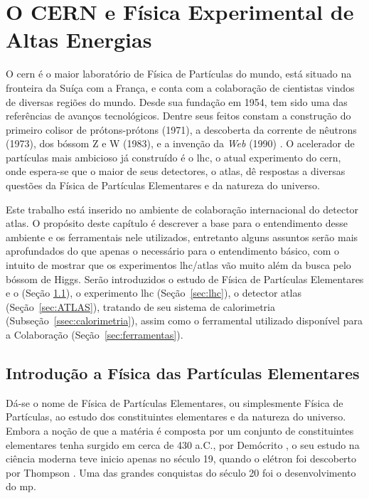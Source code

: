 \chapter{O CERN e Física Experimental de Altas Energias}
\label{cap:cern}
\glsresetall


O \gls{cern} é o maior laboratório de Física de Partículas do mundo, 
está situado na fronteira da Suíça com
a França, e conta com a colaboração de cientistas vindos 
de diversas regiões do mundo. Desde sua fundação em 1954, tem sido uma das referências de
avanços tecnológicos. Dentre seus feitos constam a construção do primeiro 
colisor de prótons-prótons (1971), a descoberta 
da corrente de nêutrons (1973), dos bóssom Z e W (1983), 
e a invenção da \emph{Web} (1990) \cite{webCERN}. O acelerador de partículas mais ambicioso 
\cite{Intro_Standard,Beiser} já construído é o \gls{lhc}, o atual experimento do
\gls{cern}, onde espera-se que o maior de seus 
detectores, o \gls{atlas}, dê respostas a diversas questões da Física de Partículas
Elementares e da natureza do universo.

Este trabalho está inserido no ambiente de colaboração internacional do detector
\gls{atlas}. O propósito deste capítulo é descrever a base para o entendimento desse ambiente
e os ferramentais nele utilizados, entretanto alguns assuntos serão mais
aprofundados do que apenas o necessário para o entendimento básico, com o
intuito de mostrar que os experimentos \gls{lhc}/\gls{atlas} vão muito além 
da busca pelo bóssom de Higgs. Serão introduzidos o estudo de Física de Partículas
Elementares e o  (Seção \ref{sec:fis_part}), 
o experimento \gls{lhc} (Seção~\ref{sec:lhc}), o detector
\gls{atlas} (Seção~\ref{sec:ATLAS}), tratando de seu sistema de calorimetria
(Subseção~\ref{ssec:calorimetria}), assim como o ferramental utilizado
disponível para a Colaboração (Seção~\ref{sec:ferramentas}). 

\section{Introdução a Física das Partículas Elementares}
\label{sec:fis_part}

Dá-se o nome de Física de Partículas Elementares, ou simplesmente Física de
Partículas, ao estudo dos constituintes
elementares e da natureza do universo. Embora a noção de que a matéria é
composta por um conjunto de constituintes elementares tenha surgido em cerca de
430 a.C., por Demócrito \cite{democritos}, o seu estudo na ciência moderna teve inicio apenas 
no século 19, quando o elétron foi descoberto por Thompson \cite{thompson}.
Uma das grandes conquistas do século 20 foi o desenvolvimento do \gls{mp}.  

